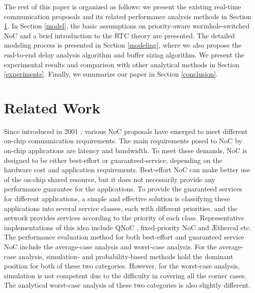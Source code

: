\documentclass[preprint]{elsarticle}
\begin{document}
The rest of this paper is organized as follows: we present the existing real-time communication proposals and its related performance analysis methods in Section \ref{related}. In Section \ref{model}, the basic assumptions on priority-aware wormhole-switched NoC and a brief introduction to the RTC theory are presented. The detailed modeling process is presented in Section \ref{modeling}, where we also propose the end-to-end delay analysis algorithm and buffer sizing algorithm. We present the experimental results and comparison with other analytical methods in Section \ref{experiments}. Finally, we summarize our paper in Section \ref{conclusion}.

\section{Related Work}\label{related}
Since introduced in 2001 \cite{DaTo01}, various NoC proposals have emerged to meet different on-chip communication requirements. The main requirements posed to NoC by on-chip applications are latency and bandwidth. To meet these demands, NoC is designed to be either best-effort or guaranteed-service, depending on the hardware cost and application requirements. Best-effort NoC can make better use of the on-chip shared resource, but it does not necessarily provide any performance guarantee for the applications. To provide the guaranteed services for different applications, a simple and effective solution is classifying these applications into several service classes, each with different priorities, and the network provides services according to the priority of each class. Representative implementations of this idea include QNoC \cite{BCGK04}, fixed-priority NoC \cite{Shi:2008:RCA:1397757.1397996} and {{\AE}thereal} \cite{GoDR05} etc. The performance evaluation method for both best-effort and guaranteed service NoC include the average-case analysis and worst-case analysis. For the average-case analysis, simulation- and probability-based methods hold the dominant position for both of these two categories. However, for the worst-case analysis, simulation is not competent due to the difficulty in covering all the corner cases. The analytical worst-case analysis of these two categories is also slightly different.
\end{document}

